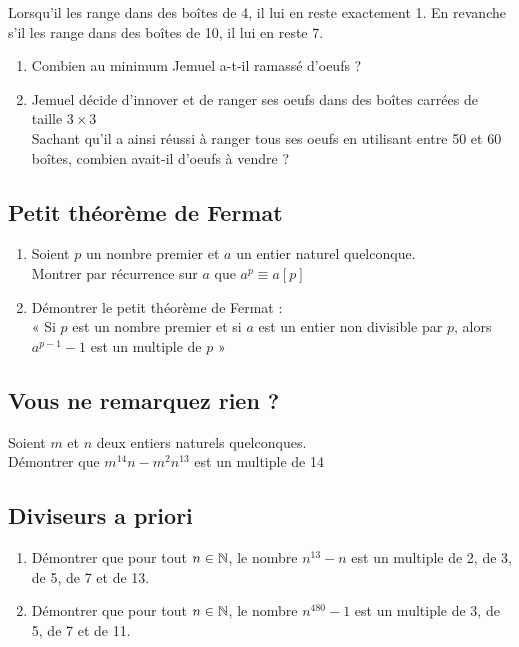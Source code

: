 \documentclass[oneside,12pt]{book}          %
\begin{document}
Lorsqu'il les range dans des boîtes de 4, il lui en reste exactement 1. En revanche s'il les range dans des boîtes de 10, il lui en reste 7.
\begin{enumerate}
    \item Combien au minimum Jemuel a-t-il ramassé d'oeufs ?
    \item Jemuel décide d'innover et de ranger ses oeufs dans des boîtes carrées de taille $3\times3$\\
    Sachant qu'il a ainsi réussi à ranger tous ses oeufs en utilisant entre 50 et 60 boîtes, combien avait-il d'oeufs à vendre ?
\end{enumerate}



\subsection{Petit théorème de Fermat}
\begin{enumerate}
    \item Soient $p$ un nombre premier et $a$ un entier naturel quelconque.\\
    Montrer par récurrence sur $a$ que $a^p\equiv a[p]$
    \item Démontrer le petit théorème de Fermat : \\
    « Si $p$ est un nombre premier et si $a$ est un entier non divisible par $p$, alors $a^{p-1}-1$ est un multiple de $p$ »
\end{enumerate}



\subsection{Vous ne remarquez rien ?}
Soient $m$ et $n$ deux entiers naturels quelconques. \\
Démontrer que $m^{14} n - m^2 n^{13}$ est un multiple de 14



\subsection{Diviseurs a priori}
\begin{enumerate}
    \item Démontrer que pour tout ${n\in\mathbb N}$, le nombre $n^{13}-n$ est un multiple de 2, de 3, de 5, de 7 et de 13.
    \item Démontrer que pour tout ${n\in\mathbb N}$, le nombre $n^{480}-1$ est un multiple de 3, de 5, de 7 et de 11.
\end{enumerate}
\end{document}

